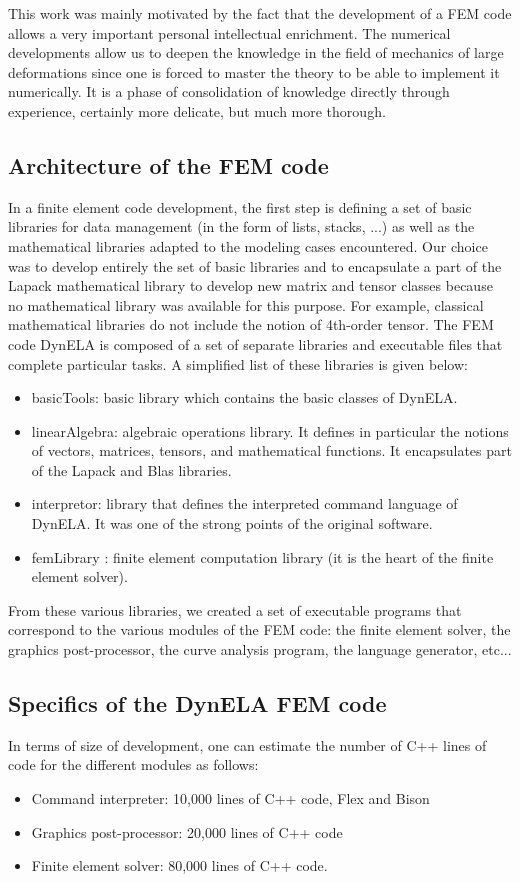 This work was mainly motivated by the fact that the development of a FEM code allows a very important personal intellectual enrichment. The numerical developments allow us to deepen the knowledge in the field of mechanics of large deformations since one is forced to master the theory to be able to implement it numerically. It is a phase of consolidation of knowledge directly through experience, certainly more delicate, but much more thorough.

\subsection{Architecture of the FEM code}

In a finite element code development, the first step is defining a set of basic libraries for data management (in the form of lists, stacks, ...) as well as the mathematical libraries adapted to the modeling cases encountered. Our choice was to develop entirely the set of basic libraries and to encapsulate a part of the Lapack \cite{Lapack:1999} mathematical library to develop new matrix and tensor classes because no mathematical library was available for this purpose. For example, classical mathematical libraries do not include the notion of 4th-order tensor. The FEM code DynELA is composed of a set of separate libraries and executable files that complete particular tasks. A simplified list of these libraries is given below:
\begin{itemize}
\item basicTools: basic library which contains the basic classes of DynELA.
\item linearAlgebra: algebraic operations library. It defines in particular the notions of vectors, matrices, tensors, and mathematical functions. It encapsulates part of the Lapack and Blas libraries.
\item interpretor: library that defines the interpreted command language of DynELA. It was one of the strong points of the original software.
\item femLibrary : finite element computation library (it is the heart of the finite element solver).
\end{itemize}
From these various libraries, we created a set of executable programs that correspond to the various modules of the FEM code: the finite element solver, the graphics post-processor, the curve analysis program, the language generator, etc...

\subsection{Specifics of the DynELA FEM code}
In terms of size of development, one can estimate the number of C++ lines of code for the different modules as follows:
\begin{itemize}
\item Command interpreter: 10,000 lines of C++ code, Flex and Bison \cite{Levine:2009}
\item Graphics post-processor: 20,000 lines of C++ code
\item Finite element solver: 80,000 lines of C++ code.
\end{itemize}

